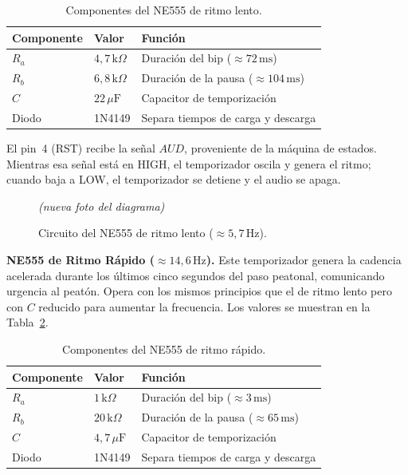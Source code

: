 \documentclass[12pt,onecolumn]{IEEEtran}
\begin{document}
\begin{table}[H]
\centering
\caption{Componentes del NE555 de ritmo lento.}
\label{tab:555lento}
\begin{tabular}{lll}
\toprule
\textbf{Componente} & \textbf{Valor} & \textbf{Función} \\
\midrule
$R_a$  & $4{,}7\,\text{k}\Omega$ & Duración del bip ($\approx 72\,\text{ms}$) \\
$R_b$  & $6{,}8\,\text{k}\Omega$ & Duración de la pausa ($\approx 104\,\text{ms}$) \\
$C$    & $22\,\mu\text{F}$       & Capacitor de temporización \\
Diodo  & 1N4149                & Separa tiempos de carga y descarga \\
\bottomrule
\end{tabular}
\end{table}

El pin~4 (RST) recibe la señal $AUD$, proveniente de la máquina de estados. Mientras esa señal está en HIGH, el temporizador oscila y genera el ritmo; cuando baja a LOW, el temporizador se detiene y el audio se apaga.

\begin{figure}[H]
    \centering
    \begin{center}\textit{(nueva foto del diagrama)}\end{center}
    \caption{Circuito del NE555 de ritmo lento ($\approx 5{,}7\,\text{Hz}$).}
    \label{fig:ritmo_lento}
\end{figure}

\textbf{NE555 de Ritmo Rápido ($\approx 14{,}6\,\text{Hz}$).}
Este temporizador genera la cadencia acelerada durante los últimos cinco segundos del paso peatonal, comunicando urgencia al peatón. Opera con los mismos principios que el de ritmo lento pero con $C$ reducido para aumentar la frecuencia. Los valores se muestran en la Tabla~\ref{tab:555rapido}.

\begin{table}[H]
\centering
\caption{Componentes del NE555 de ritmo rápido.}
\label{tab:555rapido}
\begin{tabular}{lll}
\toprule
\textbf{Componente} & \textbf{Valor} & \textbf{Función} \\
\midrule
$R_a$  & $1\,\text{k}\Omega$    & Duración del bip ($\approx 3\,\text{ms}$) \\
$R_b$  & $20\,\text{k}\Omega$  & Duración de la pausa ($\approx 65\,\text{ms}$) \\
$C$    & $4{,}7\,\mu\text{F}$  & Capacitor de temporización \\
Diodo  & 1N4149                & Separa tiempos de carga y descarga \\
\bottomrule
\end{tabular}
\end{table}
\end{document}
